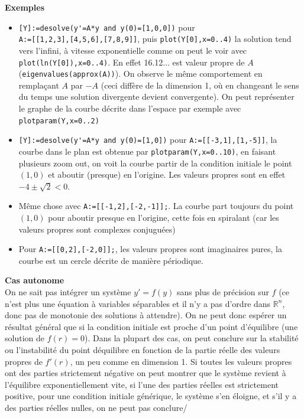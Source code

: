 \documentclass[a4paper,11pt]{article}
\begin{document}
\begin{giacjshere}
{\bf Exemples }
\begin{itemize}
\item
\verb|[Y]:=desolve(y'=A*y and y(0)=[1,0,0])| pour\\
\verb|A:=[[1,2,3],[4,5,6],[7,8,9]]|, 
puis \verb|plot(Y[0],x=0..4)| la solution tend vers l'infini,
\`a vitesse exponentielle comme on peut
le voir avec \verb|plot(ln(Y[0]),x=0..4)|.
En effet 16.12... est valeur propre de $A$
(\verb|eigenvalues(approx(A))|). On observe le m\^eme
comportement en rempla\c{c}ant $A$ par $-A$ (ceci
diff\`ere de la dimension 1, o\`u en changeant le sens
du temps une solution divergente devient convergente).
On peut repr\'esenter le graphe de la courbe d\'ecrite
dans l'espace par exemple avec \verb|plotparam(Y,x=0..2)|
\item \verb|[Y]:=desolve(y'=A*y and y(0)=[1,0])| pour 
\verb|A:=[[-3,1],[1,-5]]|, la courbe dans le plan est
obtenue par \verb|plotparam(Y,x=0..10)|, en faisant
plusieurs zoom out, on voit la courbe partir de la condition
initiale le point $(1,0)$ et aboutir (presque) en l'origine.
Les valeurs propres sont en effet $-4\pm \sqrt{2}<0$.
\item M\^eme chose avec \verb|A:=[[-1,2],[-2,-1]];|.
La courbe part toujours du point $(1,0)$ pour
aboutir presque en l'origine, cette fois en spiralant
(car les valeurs propres sont complexes conjugu\'ees)
\item Pour \verb|A:=[[0,2],[-2,0]];|, les valeurs
propres sont imaginaires pures, la courbe est un cercle
d\'ecrite de mani\`ere p\'eriodique.
\end{itemize}

{\bf Cas autonome}\\
On ne sait pas int\'egrer un syst\`eme $y'=f(y)$ sans plus
de pr\'ecision sur $f$ (ce n'est plus une \'equation \`a
variables s\'eparables et il n'y a pas d'ordre dans $\mathbb{R}^n$,
donc pas de monotonie des solutions \`a attendre).
On ne peut donc
esp\'erer un r\'esultat g\'en\'eral que si la condition initiale 
est proche d'un point d'\'equilibre (une solution de $f(r)=0$).
Dans la plupart des cas, on peut conclure sur la stabilit\'e
ou l'instabilit\'e du point d\'equilibre en fonction de la partie
r\'eelle des valeurs propres de $f'(r)$, un peu comme en dimension 1.
Si toutes les valeurs propres ont des parties strictement n\'egative
on peut montrer que
le syst\`eme revient \`a l'\'equilibre exponentiellement vite, si
l'une des parties r\'eelles est strictement positive,
pour une condition initiale g\'en\'erique, le syst\`eme s'en
\'eloigne, et s'il y a des parties r\'eelles nulles, on ne peut pas conclure/


\end{giacjshere}
\end{document}
